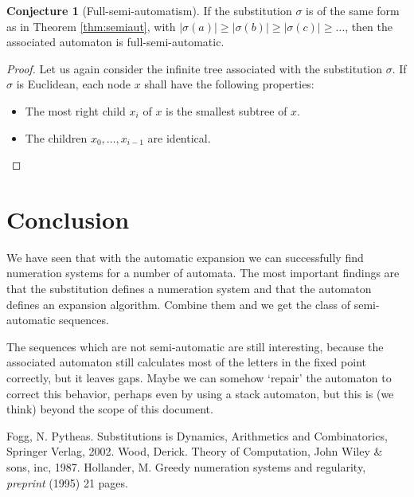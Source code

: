 \documentclass{article}
\theoremstyle{definition}
\newtheorem{conjecture}[theorem]{Conjecture}
\begin{document}
\begin{conjecture}[Full-semi-automatism]
If the substitution $\sigma$ is of the same form as in Theorem 
\ref{thm:semiaut}, with 
$|\sigma(a)| \ge |\sigma(b)| \ge |\sigma(c)| \ge \ldots$, then the 
associated automaton is full-semi-automatic.
\end{conjecture}
\begin{proof}
Let us again consider the infinite tree associated with the substitution
$\sigma$. If $\sigma$ is Euclidean, each node $x$ shall have the following 
properties:
\begin{itemize}
\item The most right child $x_i$ of $x$ is the smallest subtree of $x$.
\item The children $x_0, \ldots, x_{i - 1}$ are identical.
\end{itemize}

\end{proof}

\section{Conclusion}
We have seen that with the automatic expansion we can successfully find 
numeration systems for a number of automata. The most important findings are
that the substitution defines a numeration system and that the automaton 
defines an expansion algorithm. Combine them and we get the class of 
semi-automatic sequences.

The sequences which are not semi-automatic are still interesting, because
the associated automaton still calculates most of the letters in the fixed
point correctly, but it leaves gaps.
Maybe we can somehow `repair' the automaton to correct this behavior, 
perhaps even by using a stack automaton, but this is (we think) beyond the
scope of this document.

\begin{thebibliography}{XX}
 Fogg, N. Pytheas. Substitutions is Dynamics, Arithmetics and
               Combinatorics, Springer Verlag, 2002.
 Wood, Derick. Theory of Computation, John Wiley \& sons, inc, 
               1987.
 Hollander, M. Greedy numeration systems and regularity,
              \emph{preprint} (1995) 21 pages.
\end{thebibliography}
\end{document}
